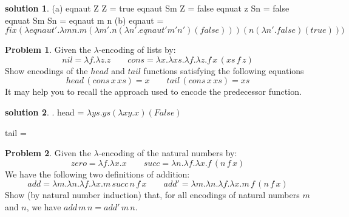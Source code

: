 \documentclass[10pt]{article}
\theoremstyle{definition}
\newtheorem{prob}{Problem}
\newtheorem{sol}{solution}
\begin{document}
\begin{sol}
  (a) eqnaut Z Z = true \newline
      eqnaut Sm Z = false \newline
      eqnuat z Sn = false \newline
      eqnuat Sm Sn = eqnaut m n \newline
  (b) eqnaut = $ fix ( \lambda eqnaut'. \lambda m n. m ( \lambda m'.n( \lambda n'. eqnaut' m' n')(false)))(n( \lambda n'. false) (true)) )$
\end{sol}

\begin{prob}
	Given the $\lambda$-encoding of lists by:
	\[
		nil = \lambda f. \lambda z. z \qquad cons = \lambda x. \lambda xs. \lambda f. \lambda z. f\,x\,(xs\,f\,z)
	\]
	Show encodings of the $head$ and $tail$ functions satisfying the following equations
	\[
		head\,(cons\,x\,xs) = x \qquad tail\,(cons\,x\,xs) = xs
	\]
	It may help you to recall the approach used to encode the predecessor function.
\end{prob}

\begin{sol}. \newline
	head = $\lambda ys.ys ( \lambda x y.x)(False)$ \newline

	tail = 
\end{sol}

\begin{prob}
	Given the $\lambda$-encoding of the natural numbers by:
	\[
		zero = \lambda f. \lambda x. x \qquad succ = \lambda n. \lambda f. \lambda x. f \, (n\,f\,x)
	\]
	We have the following two definitions of addition:
	\[
		add = \lambda m.\lambda n.\lambda f.\lambda x.m\,succ\,n\,f\,x \qquad add' = \lambda m.\lambda n.\lambda f.\lambda x. m\,f\,(n\,f\,x)
	\]
	Show (by natural number induction) that, for all encodings of natural numbers $m$ and $n$, we have $add\,m\,n = add'\,m\,n$.
\end{prob}
\end{document}
